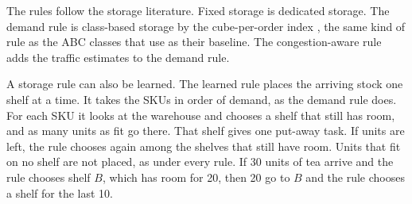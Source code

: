 %


The rules follow the storage literature. Fixed storage is dedicated storage.
The demand rule is class-based storage by the cube-per-order index
\citep{heskett1963coi,dekoster2007picking}, the same kind of rule as the ABC
classes that \citet{WaubertdePuiseau2022DynamicSL} use as their baseline. The
congestion-aware rule adds the traffic estimates to the demand rule.



A storage rule can also be learned. The learned rule places the arriving stock
one shelf at a time. It takes the SKUs in order of demand, as the demand rule
does. For each SKU it looks at the warehouse and chooses a shelf that still has
room, and as many units as fit go there. That shelf gives one put-away task. If
units are left, the rule chooses again among the shelves that still have room.
Units that fit on no shelf are not placed, as under every rule. If 30 units of
tea arrive and the rule chooses shelf $B$, which has room for 20, then 20 go to
$B$ and the rule chooses a shelf for the last 10.

